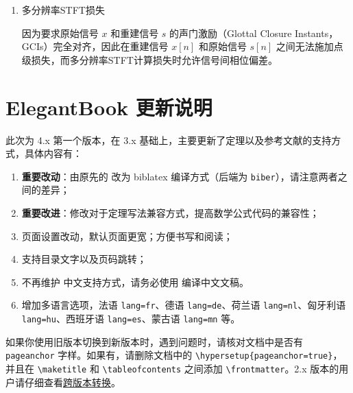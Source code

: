 \documentclass[cn,10pt,math=newtx,citestyle=gb7714-2015,bibstyle=gb7714-2015]{elegantbook}
\begin{document}
\begin{enumerate}
  \item 多分辨率STFT损失
  
  因为要求原始信号 $x$ 和重建信号 $s$ 的声门激励（Glottal Closure Instants，GCIs）完全对齐，因此在重建信号 $x[n]$ 和原始信号 $s[n]$ 之间无法施加点级损失，而多分辨率STFT计算损失时允许信号间相位偏差。
\end{enumerate}

















\section{ElegantBook 更新说明}

此次为 4.x 第一个版本，在 3.x 基础上，主要更新了定理以及参考文献的支持方式，具体内容有：

\begin{enumerate}
  \item \textbf{重要改动}：由原先的  改为 biblatex 编译方式（后端为 \lstinline{biber}），请注意两者之间的差异；
  \item \textbf{重要改进}：修改对于定理写法兼容方式，提高数学公式代码的兼容性；
  \item 页面设置改动，默认页面更宽；方便书写和阅读；
  \item 支持目录文字以及页码跳转；
  \item 不再维护  中文支持方式，请务必使用  编译中文文稿。
  \item 增加多语言选项，法语 \lstinline{lang=fr}、德语 \lstinline{lang=de}、荷兰语 \lstinline{lang=nl}、匈牙利语 \lstinline{lang=hu}、西班牙语 \lstinline{lang=es}、蒙古语 \lstinline{lang=mn} 等。
\end{enumerate}

\begin{note}
如果你使用旧版本切换到新版本时，遇到问题时，请核对文档中是否有 \lstinline{pageanchor} 字样。如果有，请删除文档中的 \lstinline|\hypersetup{pageanchor=true}|，并且在 \lstinline{\maketitle} 和 \lstinline{\tableofcontents} 之间添加 \lstinline{\frontmatter}。2.x 版本的用户请仔细查看\href{https://github.com/ElegantLaTeX/ElegantBook/wiki/convert}{跨版本转换}。
\end{note}
\end{document}
